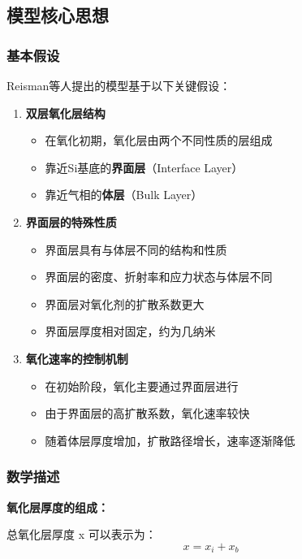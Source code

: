 \documentclass[UTF8,12pt,a4paper]{ctexart}
\begin{document}
\subsection{模型核心思想}

\subsubsection{基本假设}

Reisman等人提出的模型基于以下关键假设：

\begin{enumerate}
    \item \textbf{双层氧化层结构}
    \begin{itemize}
        \item 在氧化初期，氧化层由两个不同性质的层组成
        \item 靠近Si基底的\textbf{界面层}（Interface Layer）
        \item 靠近气相的\textbf{体层}（Bulk Layer）
    \end{itemize}
    
    \item \textbf{界面层的特殊性质}
    \begin{itemize}
        \item 界面层具有与体层不同的结构和性质
        \item 界面层的密度、折射率和应力状态与体层不同
        \item 界面层对氧化剂的扩散系数更大
        \item 界面层厚度相对固定，约为几纳米
    \end{itemize}
    
    \item \textbf{氧化速率的控制机制}
    \begin{itemize}
        \item 在初始阶段，氧化主要通过界面层进行
        \item 由于界面层的高扩散系数，氧化速率较快
        \item 随着体层厚度增加，扩散路径增长，速率逐渐降低
    \end{itemize}
\end{enumerate}

\subsubsection{数学描述}

\textbf{氧化层厚度的组成：}

总氧化层厚度 x 可以表示为：
\begin{equation}
x = x_i + x_b
\end{equation}
\end{document}
